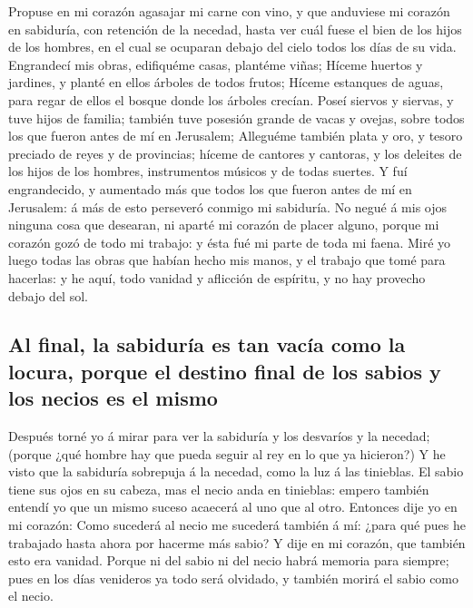  Propuse en mi corazón agasajar mi carne con vino, y que
anduviese mi corazón en sabiduría, con retención de la necedad, hasta
ver cuál fuese el bien de los hijos de los hombres, en el cual se
ocuparan debajo del cielo todos los días de su vida. 
Engrandecí mis obras, edifiquéme casas, plantéme viñas; 
Híceme huertos y jardines, y planté en ellos árboles de todos frutos;
 Híceme estanques de aguas, para regar de ellos el bosque
donde los árboles crecían.  Poseí siervos y siervas, y
tuve hijos de familia; también tuve posesión grande de vacas y ovejas,
sobre todos los que fueron antes de mí en Jerusalem; 
Alleguéme también plata y oro, y tesoro preciado de reyes y de
provincias; híceme de cantores y cantoras, y los deleites de los hijos
de los hombres, instrumentos músicos y de todas suertes. 
Y fuí engrandecido, y aumentado más que todos los que fueron antes de mí
en Jerusalem: á más de esto perseveró conmigo mi sabiduría.
 No negué á mis ojos ninguna cosa que desearan, ni aparté
mi corazón de placer alguno, porque mi corazón gozó de todo mi trabajo:
y ésta fué mi parte de toda mi faena.  Miré yo luego
todas las obras que habían hecho mis manos, y el trabajo que tomé para
hacerlas: y he aquí, todo vanidad y aflicción de espíritu, y no hay
provecho debajo del sol.

\hypertarget{al-final-la-sabiduruxeda-es-tan-vacuxeda-como-la-locura-porque-el-destino-final-de-los-sabios-y-los-necios-es-el-mismo}{%
\subsection{Al final, la sabiduría es tan vacía como la locura, porque
el destino final de los sabios y los necios es el
mismo}\label{al-final-la-sabiduruxeda-es-tan-vacuxeda-como-la-locura-porque-el-destino-final-de-los-sabios-y-los-necios-es-el-mismo}}

 Después torné yo á mirar para ver la sabiduría y los
desvaríos y la necedad; (porque ¿qué hombre hay que pueda seguir al rey
en lo que ya hicieron?)  Y he visto que la sabiduría
sobrepuja á la necedad, como la luz á las tinieblas.  El
sabio tiene sus ojos en su cabeza, mas el necio anda en tinieblas:
empero también entendí yo que un mismo suceso acaecerá al uno que al
otro.  Entonces dije yo en mi corazón: Como sucederá al
necio me sucederá también á mí: ¿para qué pues he trabajado hasta ahora
por hacerme más sabio? Y dije en mi corazón, que también esto era
vanidad.  Porque ni del sabio ni del necio habrá memoria
para siempre; pues en los días venideros ya todo será olvidado, y
también morirá el sabio como el necio.

